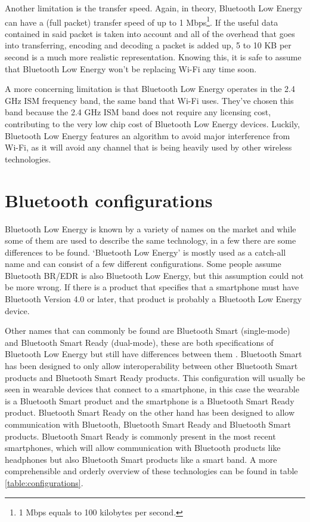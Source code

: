 \documentclass[pdftex,a4paper,12pt,twoside]{report}
\begin{document}
Another limitation is the transfer speed. Again, in theory, Bluetooth Low Energy can have a (full packet) transfer speed of up to 1 Mbps\footnote{1 Mbps equals to 100 kilobytes per second.}. If the useful data contained in said packet is taken into account and all of the overhead that goes into transferring, encoding and decoding a packet is added up, 5 to 10 KB per second is a much more realistic representation. Knowing this, it is safe to assume that Bluetooth Low Energy won't be replacing Wi-Fi any time soon.

A more concerning limitation is that Bluetooth Low Energy operates in the 2.4 GHz ISM frequency band, the same band that Wi-Fi uses. They've chosen this band because the 2.4 GHz ISM band does not require any licensing cost, contributing to the very low chip cost of Bluetooth Low Energy devices. Luckily, Bluetooth Low Energy features an algorithm to avoid major interference from Wi-Fi, as it will avoid any channel that is being heavily used by other wireless technologies.

\section{Bluetooth configurations}
\label{sec:bleconfigurations}
Bluetooth Low Energy is known by a variety of names on the market and while some of them are used to describe the same technology, in a few there are some differences to be found. `Bluetooth Low Energy' is mostly used as a catch-all name and can consist of a few different configurations. Some people assume Bluetooth BR/EDR is also Bluetooth Low Energy, but this assumption could not be more wrong. If there is a product that specifies that a smartphone must have Bluetooth Version 4.0 or later, that product is probably a Bluetooth Low Energy device.

Other names that can commonly be found are Bluetooth Smart (single-mode) and Bluetooth Smart Ready (dual-mode), these are both specifications of Bluetooth Low Energy but still have differences between them \citep{Townsend2014}. Bluetooth Smart has been designed to only allow interoperability between other Bluetooth Smart products and Bluetooth Smart Ready products. This configuration will usually be seen in wearable devices that connect to a smartphone, in this case the wearable is a Bluetooth Smart product and the smartphone is a Bluetooth Smart Ready product. Bluetooth Smart Ready on the other hand has been designed to allow communication with Bluetooth, Bluetooth Smart Ready and Bluetooth Smart products. Bluetooth Smart Ready is commonly present in the most recent smartphones, which will allow communication with Bluetooth products like headphones but also Bluetooth Smart products like a smart band. A more comprehensible and orderly overview of these technologies can be found in table \ref{table:configurations}.
\end{document}
